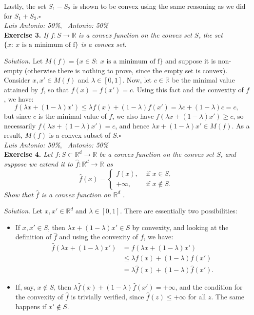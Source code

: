 \documentclass[12pt]{article}
\newcommand*{\QED}{\null\nobreak\hfill\ensuremath{\square}}%
\begin{document}
Lastly, the set \( S_1 - S_2 \) is shown to be convex using the same reasoning as we did for $S_1+S_2$.\QED\\

\textit{Luis Antonio: 50\%}, \ \textit{Antonio: 50\%}\\
\textbf{Exercise 3. }\emph{If \( f: S \to \mathbb{R} \) is a convex function on the convex set \( S \), the set \( \{x : \ x \text{ is a minimum of f} \} \) is a convex set.}

\emph{Solution.} Let \( M(f) = \{x \in S: \ x \text{ is a minimum of f} \} \) and suppose it is non-empty (otherwise there is nothing to prove, since the empty set is convex). Consider \( x, x' \in M(f) \) and \( \lambda \in [0,1] \). Now, let  $c\in \mathbb R$ be the minimal value attained by $f$, so that $f(x)=f(x')=c$. Using this fact and the convexity of $f$, we have:
\[
    f(\lambda x + (1-\lambda)x') \leq \lambda f(x) + (1-\lambda)f(x') = \lambda c + (1-\lambda)c = c,
\]
but since $c$ is the minimal value of $f$, we also have $f(\lambda x + (1-\lambda)x') \geq c$, so necessarily $f(\lambda x + (1-\lambda)x')=c$, and hence $\lambda x + (1-\lambda)x' \in M(f)$. As a result, \( M(f) \) is a convex subset of \( S \).\QED\\

\textit{Luis Antonio: 50\%}, \ \textit{Antonio: 50\%}\\
\textbf{Exercise 4. }\emph{Let \( f : S \subset \mathbb{R}^d  \to \mathbb{R}\) be a convex function on the convex set \( S \), and suppose we extend it to \( \hat{f}:\mathbb{R}^d \to \mathbb{R}\) as  }
\[
    \hat{f}(x) = \begin{cases}
        f(x), &\text{ if } x \in S,\\
        +\infty, &\text{ if } x \notin S.
    \end{cases}
\]
\emph{Show that \( \hat{f} \) is a convex function on \( \mathbb{R}^d \) }.

\emph{Solution}. Let \( x, x' \in \mathbb{R}^d \) and \( \lambda \in [0,1] \). There are essentially two possibilities:
\begin{itemize}
    \item If \( x,x' \in S \), then $\lambda x + (1-\lambda)x' \in S$ by convexity, and looking at the definition of $\hat f$ and using the convexity of $f$, we have:
     \begin{align*}\hat{f}(\lambda x + (1-\lambda)x') &= f(\lambda x + (1-\lambda)x')\\
       &\leq \lambda f(x) + (1-\lambda) f(x')\\
        &= \lambda \hat f(x) + (1-\lambda)\hat f(x'). \end{align*}
    \item If, say, \( x \notin S \), then \( \lambda \hat{f}(x) + (1-\lambda)\hat{f}(x') =+\infty \), and the condition for the convexity of $\hat f$ is trivially verified, since $\hat f(z) \leq +\infty$ for all $z$. The same happens if \( x' \notin S \).
\end{itemize}
\end{document}
